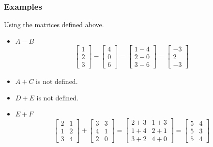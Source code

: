 \documentclass[14pt]{extarticle}
\begin{document}
\subsubsection*{Examples} Using the matrices defined above.
\begin{itemize}
	\item $A-B$
\begin{align*}
	\begin{bmatrix}
		1 \\
		2 \\
		3
	\end{bmatrix} -
	\begin{bmatrix}
		4 \\
		0 \\
		6
	\end{bmatrix}
	= \begin{bmatrix}
		1 -4\\
		2 -0\\
		3 -6
	\end{bmatrix}
	= \begin{bmatrix}
		-3 \\
		2 \\
		-3
	\end{bmatrix}
\end{align*}
\item $A+C$ is not defined.
\item $D+E$ is not defined.
\item $E+F$
\begin{align*}
	\begin{bmatrix}
		2 & 1 \\
		1 & 2 \\
		3 & 4
	\end{bmatrix} +
	 \begin{bmatrix}
		3 & 3 \\
		4 & 1 \\
		2 & 0
	\end{bmatrix} =
	\begin{bmatrix}
		2+3 & 1+3 \\
		1+4 & 2+1 \\
		3+2 & 4+0
	\end{bmatrix} =
	\begin{bmatrix}
		5 & 4 \\
		5 & 3 \\
		5 & 4
	\end{bmatrix}
\end{align*}
\end{itemize}
\end{document}
